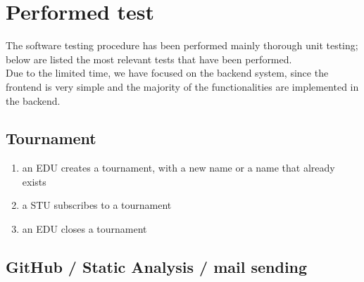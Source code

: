 \chapter{Performed test}

The software testing procedure has been performed mainly thorough unit testing; below are listed the most relevant tests that have been performed.\\
Due to the limited time, we have focused on the backend system, since the frontend is very simple and the majority of the functionalities are implemented in the backend.


\section{Tournament}

\begin{enumerate}
    \item an EDU creates a tournament, with a new name or a name that already exists
    \item a STU subscribes to a tournament
    \item an EDU closes a tournament
\end{enumerate}

\section{GitHub / Static Analysis / mail sending}

